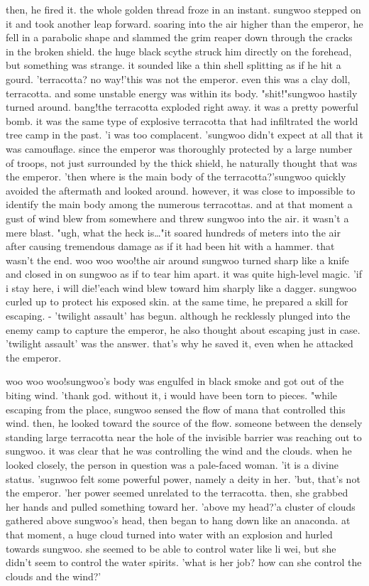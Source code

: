  then, he fired it.
the whole golden thread froze in an instant.
 sungwoo stepped on it and took another leap forward.
soaring into the air higher than the emperor, he fell in a parabolic shape and slammed the grim reaper down through the cracks in the broken shield.
the huge black scythe struck him directly on the forehead, but something was strange.
it sounded like a thin shell splitting as if he hit a gourd.
'terracotta? no way!'this was not the emperor.
 even this was a clay doll, terracotta.
 and some unstable energy was within its body.
"shit!"sungwoo hastily turned around.
bang!the terracotta exploded right away.
 it was a pretty powerful bomb.
it was the same type of explosive terracotta that had infiltrated the world tree camp in the past.
'i was too complacent.
'sungwoo didn't expect at all that it was camouflage.
 since the emperor was thoroughly protected by a large number of troops, not just surrounded by the thick shield, he naturally thought that was the emperor.
'then where is the main body of the terracotta?'sungwoo quickly avoided the aftermath and looked around.
 however, it was close to impossible to identify the main body among the numerous terracottas.
and at that moment a gust of wind blew from somewhere and threw sungwoo into the air.
 it wasn't a mere blast.
"ugh, what the heck is…"it soared hundreds of meters into the air after causing tremendous damage as if it had been hit with a hammer.
 that wasn't the end.
woo woo woo!the air around sungwoo turned sharp like a knife and closed in on sungwoo as if to tear him apart.
 it was quite high-level magic.
'if i stay here, i will die!'each wind blew toward him sharply like a dagger.
sungwoo curled up to protect his exposed skin.
 at the same time, he prepared a skill for escaping.
- 'twilight assault' has begun.
although he recklessly plunged into the enemy camp to capture the emperor, he also thought about escaping just in case.
 'twilight assault' was the answer.
 that's why he saved it, even when he attacked the emperor.


woo woo woo!sungwoo's body was engulfed in black smoke and got out of the biting wind.
'thank god.
 without it, i would have been torn to pieces.
"while escaping from the place, sungwoo sensed the flow of mana that controlled this wind.
then, he looked toward the source of the flow.
someone between the densely standing large terracotta near the hole of the invisible barrier was reaching out to sungwoo.
 it was clear that he was controlling the wind and the clouds.
when he looked closely, the person in question was a pale-faced woman.
'it is a divine status.
'sugnwoo felt some powerful power, namely a deity in her.
'but, that's not the emperor.
'her power seemed unrelated to the terracotta.
then, she grabbed her hands and pulled something toward her.
'above my head?'a cluster of clouds gathered above sungwoo's head, then began to hang down like an anaconda.
at that moment, a huge cloud turned into water with an explosion and hurled towards sungwoo.
she seemed to be able to control water like li wei, but she didn't seem to control the water spirits.
'what is her job? how can she control the clouds and the wind?'

 
